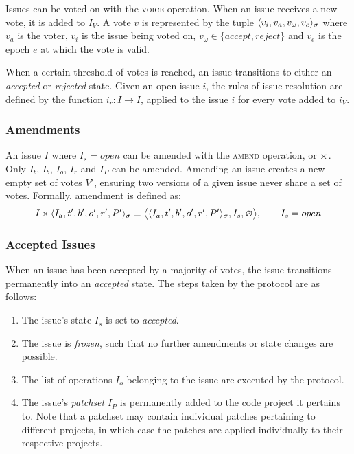 Issues can be voted on with the \textsc{voice} operation. When an issue receives
a new vote, it is added to $I_V$. A vote $v$ is represented by the tuple
$\langle v_i, v_a, v_{\omega}, v_e \rangle_{\sigma}$ where $v_a$ is the voter,
$v_i$ is the issue being voted on, $v_{\omega} \in \{accept, reject\}$ and
$v_e$ is the epoch $e$ at which the vote is valid.

When a certain threshold of votes is reached, an issue transitions to either an
\emph{accepted} or \emph{rejected} state. Given an open issue $i$, the rules of
issue resolution are defined by the function $i_r : I \to I$, applied to the
issue $i$ for every vote added to $i_V$.

\subsubsection{Amendments}

An issue $I$ where $I_s = open$ can be amended with the \textsc{amend}
operation, or $\operatorname{\times}$. Only $I_t$, $I_b$, $I_o$, $I_r$ and $I_P$ can be
amended.  Amending an issue creates a new empty set of votes $V'$, ensuring two
versions of a given issue never share a set of votes. Formally, amendment is
defined as:
\begin{align*}
    I \operatorname{\times}{} \langle I_a, t', b', o', r', P' \rangle_{\sigma} \equiv
    \big<\langle I_a, t', b', o', r', P' \rangle_{\sigma}, I_s, \varnothing
    \big>, \qquad I_s = open
\end{align*}


\subsubsection{Accepted Issues} When an issue has been accepted by a majority
of votes, the issue transitions permanently into an \emph{accepted} state. The
steps taken by the protocol are as follows:

\begin{enumerate}
    \item The issue's state $I_s$ is set to \emph{accepted}.
    \item The issue is \emph{frozen}, such that no further amendments or state
        changes are possible.
    \item The list of operations $I_o$ belonging to the issue are executed by
        the protocol.
    \item The issue's \emph{patchset} $I_P$ is permanently added to the code
        project it pertains to. Note that a patchset may contain individual
        patches pertaining to different projects, in which case the patches are
        applied individually to their respective projects.
\end{enumerate}

